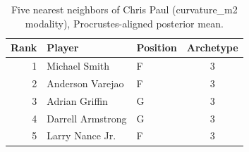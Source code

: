 \begin{table}[htbp]
  \centering\small
  \begin{tabular}{rllc}
    \toprule
    Rank & Player & Position & Archetype \\
    \midrule
    1 & Michael Smith & F & 3 \\
    2 & Anderson Varejao & F & 3 \\
    3 & Adrian Griffin & G & 3 \\
    4 & Darrell Armstrong & G & 3 \\
    5 & Larry Nance Jr. & F & 3 \\
    \bottomrule
  \end{tabular}
  \caption{Five nearest neighbors of Chris Paul (curvature_m2 modality), Procrustes-aligned posterior mean.}
  \label{tab:Chris_Paul_neighbors_curvature_m2}
\end{table}

